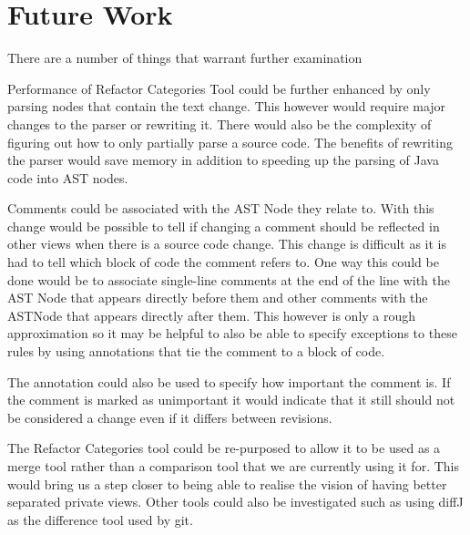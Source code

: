 
\chapter{Future Work}

There are a number of things that warrant further examination 

Performance of Refactor Categories Tool could be further enhanced by only parsing nodes that contain the text change.  This however would require major changes to the parser or rewriting it. There would also be the complexity of figuring out how to only partially parse a source code. The benefits of rewriting the parser would save memory in addition to speeding up the parsing of Java code into AST nodes.


Comments could be associated with the AST Node they relate to.  With this change would be possible to tell if changing a comment should be reflected in other views when there is a source code change. This change is difficult as it is had to tell which block of code the comment refers to.  One way this could be done would be to associate single-line comments at the end of the line with the AST Node that appears directly before them and other comments with the ASTNode that appears directly after them.  This however is only a rough approximation so it may be helpful to also be able to specify exceptions to these rules by using annotations that tie the comment to a block of code.

The annotation could also be used to specify how important the comment is. If the comment is marked as unimportant it would indicate that it still should not be considered a change even if it differs between revisions.

The Refactor Categories tool could be re-purposed to allow it to be used as a merge tool rather than a comparison tool that we are currently using it for.  This would bring us a step closer to being able to realise the vision of having better separated private views.  Other tools could also be investigated such as using diffJ as the difference tool used by git.
% 
% 
% 
% 





